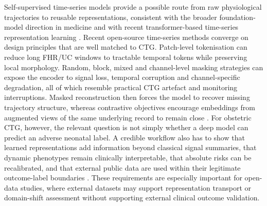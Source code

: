 \documentclass[pdflatex,sn-nature]{sn-jnl}
\begin{document}
Self-supervised time-series models provide a possible route from raw physiological trajectories to reusable representations, consistent with the broader foundation-model direction in medicine and with recent transformer-based time-series representation learning \cite{moor2023,zerveas2021,nie2023,yue2022,goswami2024moment}. Recent open-source time-series methods converge on design principles that are well matched to CTG. Patch-level tokenisation can reduce long FHR/UC windows to tractable temporal tokens while preserving local morphology. Random, block, mixed and channel-level masking strategies can expose the encoder to signal loss, temporal corruption and channel-specific degradation, all of which resemble practical CTG artefact and monitoring interruptions. Masked reconstruction then forces the model to recover missing trajectory structure, whereas contrastive objectives encourage embeddings from augmented views of the same underlying record to remain close \cite{nie2023,yue2022,zhang2022tfc}. For obstetric CTG, however, the relevant question is not simply whether a deep model can predict an adverse neonatal label. A credible workflow also has to show that learned representations add information beyond classical signal summaries, that dynamic phenotypes remain clinically interpretable, that absolute risks can be recalibrated, and that external public data are used within their legitimate outcome-label boundaries \cite{tripodai2024,vanCalster2019,vickers2006}. These requirements are especially important for open-data studies, where external datasets may support representation transport or domain-shift assessment without supporting external clinical outcome validation.
\end{document}
